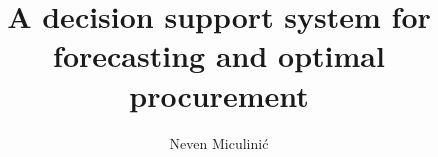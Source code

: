 \documentclass[times, utf8, zavrsni]{fer}
\begin{document}
\theoremstyle{definition}
\newtheorem{definition}{Definition}[section]

\title{A decision support system for forecasting and optimal procurement}
\author{Neven Miculinić}

\maketitle

\zahvala{}
\tableofcontents










\end{document}

